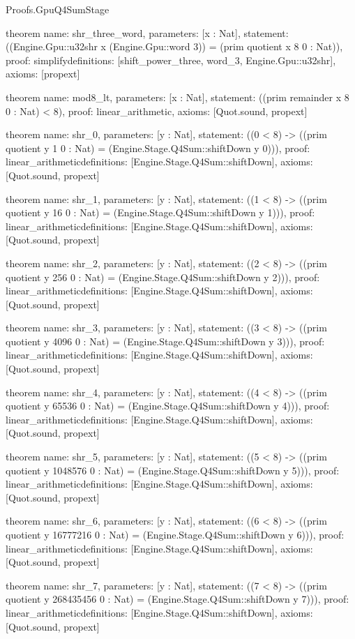 \begin{lexlean}{Proofs.GpuQ4SumStage}
\begin{semanticmodule}
theorem{
  name: shr_three_word,
  parameters: [x : Nat],
  statement: ((Engine.Gpu::u32shr x (Engine.Gpu::word 3)) = (prim quotient x 8 0 : Nat)),
  proof: simplify{definitions: [shift_power_three, word_3, Engine.Gpu::u32shr]},
  axioms: [propext]
}

theorem{
  name: mod8_lt,
  parameters: [x : Nat],
  statement: ((prim remainder x 8 0 : Nat) < 8),
  proof: linear_arithmetic{},
  axioms: [Quot.sound, propext]
}

theorem{
  name: shr_0,
  parameters: [y : Nat],
  statement: ((0 < 8) -> ((prim quotient y 1 0 : Nat) = (Engine.Stage.Q4Sum::shiftDown y 0))),
  proof: linear_arithmetic{definitions: [Engine.Stage.Q4Sum::shiftDown]},
  axioms: [Quot.sound, propext]
}

theorem{
  name: shr_1,
  parameters: [y : Nat],
  statement: ((1 < 8) -> ((prim quotient y 16 0 : Nat) = (Engine.Stage.Q4Sum::shiftDown y 1))),
  proof: linear_arithmetic{definitions: [Engine.Stage.Q4Sum::shiftDown]},
  axioms: [Quot.sound, propext]
}

theorem{
  name: shr_2,
  parameters: [y : Nat],
  statement: ((2 < 8) -> ((prim quotient y 256 0 : Nat) = (Engine.Stage.Q4Sum::shiftDown y 2))),
  proof: linear_arithmetic{definitions: [Engine.Stage.Q4Sum::shiftDown]},
  axioms: [Quot.sound, propext]
}

theorem{
  name: shr_3,
  parameters: [y : Nat],
  statement: ((3 < 8) -> ((prim quotient y 4096 0 : Nat) = (Engine.Stage.Q4Sum::shiftDown y 3))),
  proof: linear_arithmetic{definitions: [Engine.Stage.Q4Sum::shiftDown]},
  axioms: [Quot.sound, propext]
}

theorem{
  name: shr_4,
  parameters: [y : Nat],
  statement: ((4 < 8) -> ((prim quotient y 65536 0 : Nat) = (Engine.Stage.Q4Sum::shiftDown y 4))),
  proof: linear_arithmetic{definitions: [Engine.Stage.Q4Sum::shiftDown]},
  axioms: [Quot.sound, propext]
}

theorem{
  name: shr_5,
  parameters: [y : Nat],
  statement: ((5 < 8) -> ((prim quotient y 1048576 0 : Nat) = (Engine.Stage.Q4Sum::shiftDown y 5))),
  proof: linear_arithmetic{definitions: [Engine.Stage.Q4Sum::shiftDown]},
  axioms: [Quot.sound, propext]
}

theorem{
  name: shr_6,
  parameters: [y : Nat],
  statement: ((6 < 8) -> ((prim quotient y 16777216 0 : Nat) = (Engine.Stage.Q4Sum::shiftDown y 6))),
  proof: linear_arithmetic{definitions: [Engine.Stage.Q4Sum::shiftDown]},
  axioms: [Quot.sound, propext]
}

theorem{
  name: shr_7,
  parameters: [y : Nat],
  statement: ((7 < 8) -> ((prim quotient y 268435456 0 : Nat) = (Engine.Stage.Q4Sum::shiftDown y 7))),
  proof: linear_arithmetic{definitions: [Engine.Stage.Q4Sum::shiftDown]},
  axioms: [Quot.sound, propext]
}


\end{semanticmodule}
\end{lexlean}
